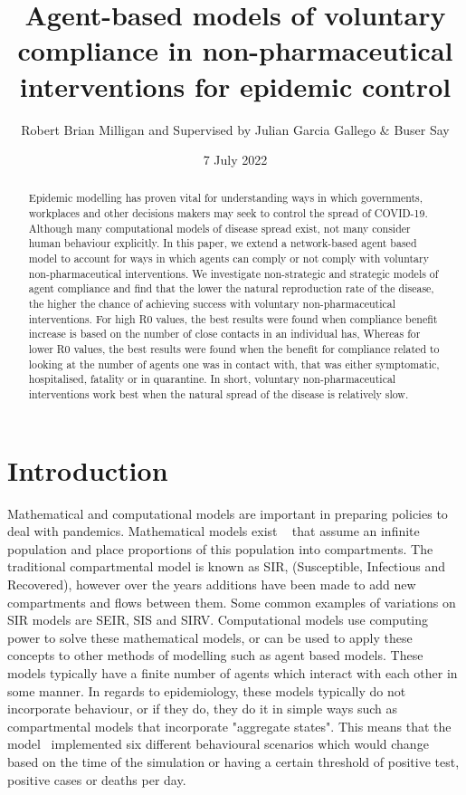 \documentclass{article}
\title{Agent-based models of voluntary compliance in non-pharmaceutical interventions for epidemic control}
\author{Robert Brian Milligan and Supervised by Julian Garcia Gallego \& Buser Say}
\date{7 July 2022}
\begin{document}
\maketitle

\begin{abstract}
Epidemic modelling has proven vital for understanding ways in which governments, workplaces and other decisions makers may seek to control the spread of COVID-19. Although many computational models of disease spread exist, not many consider human behaviour explicitly. In this paper, we extend a network-based agent based model to account for ways in which agents can comply or not comply with voluntary non-pharmaceutical interventions. We investigate non-strategic and strategic models of agent compliance and find that the lower the natural reproduction rate of the disease, the higher the chance of achieving success with voluntary non-pharmaceutical interventions. For high R0 values, the best results were found when compliance benefit increase is based on the number of close contacts in an individual has, Whereas for lower R0 values, the best results were found when the benefit for compliance related to looking at the number of agents one was in contact with, that was either symptomatic, hospitalised, fatality or in quarantine. In short, voluntary non-pharmaceutical interventions work best when the natural spread of the disease is relatively slow.
\end{abstract}



\tableofcontents

\newpage 

\section{Introduction}

Mathematical and computational models are important in preparing policies to deal with pandemics. Mathematical models exist ~\cite{cooper_mondal_antonopoulos_2020} that assume an infinite population and place proportions of this population into compartments. The traditional compartmental model is known as SIR, (Susceptible, Infectious and Recovered), however over the years additions have been made to add new compartments and flows between them. Some common examples of variations on SIR models are SEIR, SIS and SIRV. Computational models use computing power to solve these mathematical models, or can be used to apply these concepts to other methods of modelling such as agent based models. These models typically have a finite number of agents which interact with each other in some manner. In regards to epidemiology, these models typically do not incorporate behaviour, or if they do, they do it in simple ways such as compartmental models that incorporate "aggregate states". This means that the model~\cite{karaivanov_2020} implemented six different behavioural scenarios which would change based on the time of the simulation or having a certain threshold of positive test, positive cases or deaths per day.\newline
\end{document}
